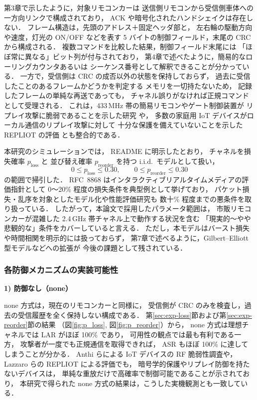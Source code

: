 \documentclass[twocolumn,10pt,a4paper]{jsarticle}
\begin{document}
第3章で示したように，対象リモコンカーは
送信側リモコンから受信側車体への一方向リンクで構成されており，
ACK や暗号化されたハンドシェイクは存在しない．
フレーム構造は，先頭のアドレス＋固定ヘッダ部と，
左右輪の駆動方向や速度，灯光の ON/OFF などを表す
5 バイトの制御フィールド，末尾の CRC から構成される．
複数コマンドを比較した結果，制御フィールド末尾には
「ほぼ常に異なる」ビット列が付与されており，
第4章で述べたように，簡易的なローリングカウンタあるいは
シーケンス番号として解釈できることが分かっている．
一方で，受信側は CRC の成否以外の状態を保持しておらず，
過去に受信したことのあるフレームかどうかを判定する
メモリを一切持たないため，
記録したフレームの単純な再送であっても，
チャネル誤りがなければ正規コマンドとして受理される．
これは，433\,MHz 帯の簡易リモコンやゲート制御装置が
リプレイ攻撃に脆弱であることを示した研究
\cite{Mykhaylova2024RCReplay,FSK_RemoteAN}や，
多数の家庭用 IoT デバイスがローカル通信のリプレイ攻撃に対して
十分な保護を備えていないことを示した REPLIOT の評価
\cite{Lazzaro2024,LazzaroREPLIOT}とも整合的である．

本研究のシミュレーションでは，
README に明示したとおり\cite{ReplaySimReadmeJP}，
チャネルを損失確率 $p_{\mathrm{loss}}$ と
並び替え確率 $p_{\mathrm{reorder}}$ を持つ i.i.d.\ モデルとして扱い，
\[
  0 \leq p_{\mathrm{loss}} \leq 0.30,\qquad
  0 \leq p_{\mathrm{reorder}} \leq 0.30
\]
の範囲で掃引した．
RFC~8868 はインタラクティブリアルタイムメディアの評価指針として
0～20\% 程度の損失条件を典型例として挙げており\cite{RFC8868}，
パケット損失・乱序を対象としたモデル化や性能評価研究も
数十\% 程度までの悪条件を取り扱っている\cite{rfc4737,RFC5170,Neumann2005FEC}．
したがって，本論文で採用したパラメータ範囲は，
市販リモコンカーが混雑した 2.4\,GHz 帯チャネル上で動作する状況を含む
「現実的～やや悲観的な」条件をカバーしていると言える．
ただし，本モデルはバースト損失や時間相関を明示的には扱っておらず，
第7章で述べるように，Gilbert--Elliott 型モデル\cite{Hasslinger2008GE}などへの拡張が
今後の課題として残されている．

\subsubsection{各防御メカニズムの実装可能性}

\vspace{1em}
\noindent\textbf{1) 防御なし（none）}\par
none 方式は，現在のリモコンカーと同様に，
受信側が CRC のみを検査し，過去の受信履歴を全く保持しない構成である．
第\ref{sec:exp-loss}節および第\ref{sec:exp-reorder}節の結果
（図\ref{fig:p_loss}, 図\ref{fig:p_reorder}）から，
none 方式は理想チャネルでは LAR がほぼ 100\% であり，
可用性の観点では最も有利である一方，
攻撃者が一度でも正規通信を取得できれば，
ASR もほぼ 100\% に達してしまうことが分かる．
Anthi らによる IoT デバイスの RF 脆弱性調査\cite{Anthi2024RFVuln}や，
Lazzaro らの REPLIOT による評価\cite{Lazzaro2024,LazzaroREPLIOT}でも，
暗号学的保護やリプレイ防御を持たないデバイスは，
単純な重放だけで高確率で制御可能であることが示されており，
本研究で得られた none 方式の結果は，こうした実機観測とも一致している．
\end{document}
